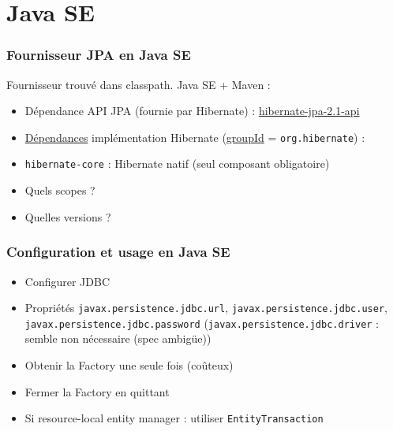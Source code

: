 \documentclass[english, french]{beamer}
\begin{document}
\section{Java SE}
\begin{frame}
	\frametitle{Fournisseur JPA en Java SE}
	Fournisseur trouvé dans classpath. Java SE + Maven :
	\begin{itemize}
		\item Dépendance API JPA (fournie par Hibernate) : \href{http://search.maven.org/\#search\%7Cgav\%7C1\%7Cg\%3A\%22org.hibernate.javax.persistence\%22\%20AND\%20a\%3A\%22hibernate-jpa-2.1-api\%22}{hibernate-jpa-2.1-api}
		\item \href{http://docs.jboss.org/hibernate/orm/5.2/quickstart/html_single/\#_the_hibernate_modules_artifacts}{Dépendances} implémentation Hibernate {\tiny (\href{http://docs.jboss.org/hibernate/orm/5.2/quickstart/html_single/\#_maven_repository_artifacts}{groupId} = \texttt{org.hibernate})} :
		\item \texttt{hibernate-core} : Hibernate natif (seul composant obligatoire)
    		\item Quels scopes ?
		\item Quelles versions ?
	\end{itemize}
\end{frame}

\begin{frame}
	\frametitle{Configuration et usage en Java SE}
	\begin{itemize}
		\item Configurer JDBC
		\item Propriétés \texttt{javax.persistence.jdbc.url}, \texttt{javax.persistence.jdbc.user}, \texttt{javax.persistence.jdbc.password} {\tiny (\texttt{javax.persistence.jdbc.driver} : semble non nécessaire (spec ambigüe))}
		\item Obtenir la Factory une seule fois (coûteux)
		\item Fermer la Factory en quittant
		\item Si resource-local entity manager : utiliser \texttt{EntityTransaction}
	\end{itemize}
\end{frame}
\end{document}
